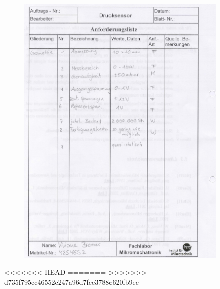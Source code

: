 \newpage

\begin{figure}[H]
	\centering
	\includegraphics[width=0.9\textwidth]{figures/Anforderungsliste_Bremer.png}
\end{figure}

\newpage

\begin{figure}[H]
	\centering
	
\end{figure}
\newpage

\begin{figure}[H]
	\centering
	
\end{figure}
\newpage

%	
%
%
%	
<<<<<<< HEAD
=======
>>>>>>> d735f795cc46552c247a96d7fce3788c620fb9ec
